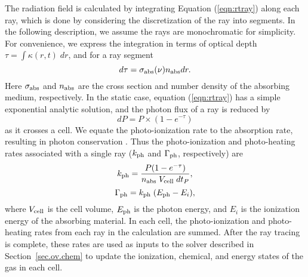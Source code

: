 The radiation field is calculated by integrating Equation
(\ref{eqn:rtray}) along each ray, which is done by considering the
discretization of the ray into segments.  In the following
description, we assume the rays are monochromatic for simplicity.  For
convenience, we express the integration in terms of optical depth
$\tau = \int \kappa(r,t) \; dr$, and for a ray segment
%
\begin{equation}
  \label{eqn:dtau}
  d\tau = \sigma_{\rm abs}(\nu) n_{\rm abs} dr.
\end{equation}
Here $\sigma_{\rm abs}$ and $n_{\rm abs}$ are the cross section and
number density of the absorbing medium, respectively.  In the static
case, equation (\ref{eqn:rtray}) has a simple exponential analytic
solution, and the photon flux of a ray is reduced by
%
\begin{equation}
  \label{eqn:flux}
  dP = P \times (1 - e^{-\tau})
\end{equation}
as it crosses a cell.  We equate the photo-ionization rate to the
absorption rate, resulting in photon conservation \citep{Abel99_RT,
Mellema06}.  Thus the photo-ionization and photo-heating rates
associated with a single ray ($k_{\rm ph}$ and $\Gamma_{\rm ph}$,
respectively) are
%
\begin{equation}
  \label{eqn:kph}
  k_{\rm ph} = \frac{P (1 - e^{-\tau})}{n_{\rm abs} \; V_{\rm cell} \; dt_P},
\end{equation}
\begin{equation}
  \label{eqn:gamma}
  \Gamma_{\rm ph} = k_{\rm ph} \; (E_{\rm ph} - E_i),
\end{equation}
where $V_{\rm cell}$ is the cell volume, $E_{\rm ph}$ is the photon
energy, and $E_i$ is the ionization energy of the absorbing material.
In each cell, the photo-ionization and photo-heating rates from each
ray in the calculation are summed. After the ray tracing is complete,
these rates are used as inputs to the solver described in
Section~\ref{sec.ov.chem} to update the ionization, chemical, and
energy states of the gas in each cell.

